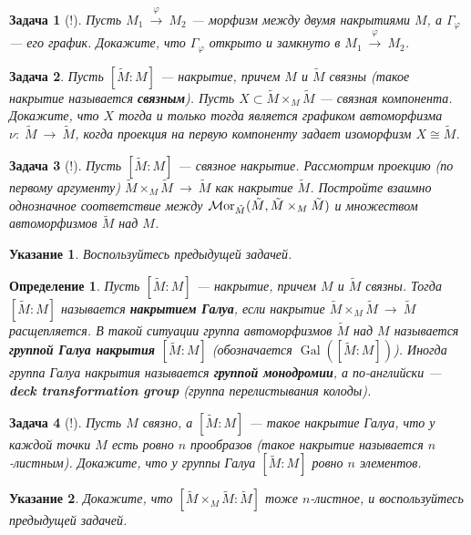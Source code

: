 \documentclass[12pt]{book}
\newcommand{\arrow}{{\:\longrightarrow\:}}
\renewcommand{\phi}{\varphi}
\newcommand{\Gal}{\operatorname{Gal}}
\newcommand{\Mor}{\operatorname{{\cal M}or}}
\theoremstyle{upshape}
\newtheorem{zadacha}{Задача}[chapter]
\theoremstyle{generic}
\newtheorem{opredelenie}[teorema]{Определение}
\theoremstyle{upshapenonumber}
\newtheorem{ukazanie}{Указание}[section]
\newcommand{\следствие}{%
     \refstepcounter{teorema}
     {\noindent\bf Следствие \thechapter.\arabic{teorema}:\ }}
\newcommand{\пример}{%
     \refstepcounter{teorema}
     {\noindent\bf Пример \thechapter.\arabic{teorema}:\ }}
\newcommand{\лемма}{%
     \refstepcounter{teorema}
     {\noindent\bf Лемма \thechapter.\arabic{teorema}:\ }}
\newcommand{\теорема}{%
     \refstepcounter{teorema}
     {\noindent\bf Теорема \thechapter.\arabic{teorema}:\ }}
\newcommand{\утверждение}{%
     \refstepcounter{teorema}
     {\noindent\bf Утверждение \thechapter.\arabic{teorema}:\ }}
\begin{document}
{\begin{zadacha}[!] 
Пусть $M_1\stackrel\phi\arrow M_2$ --- морфизм
между двумя накрытиями $M$, а $\Gamma_\phi$ --- его график.
Докажите, что $\Gamma_\phi$ открыто и замкнуто в 
$M_1\stackrel\phi\arrow M_2$.
\end{zadacha}

\begin{zadacha}
Пусть $[\tilde M:M]$ --- накрытие, причем
$M$ и $\tilde M$ связны (такое накрытие называется {\bf связным}). 
Пусть $X\subset \tilde M\times_M\tilde M$ --- 
связная компонента. Докажите,  что $X$ тогда и только тогда
является графиком автоморфизма 
$\nu:\; \tilde M \arrow \tilde M$, 
когда проекция на первую компоненту задает изоморфизм
$X\cong \tilde M$.
\end{zadacha}

\begin{zadacha}[!]\label{_Mor_v_pro_Zadacha_}
Пусть $[\tilde M:M]$ --- связное накрытие.
Рассмотрим проекцию (по первому аргументу)
$\tilde M\times_M\tilde M \arrow \tilde M$ как накрытие
$\tilde M$. Постройте взаимно однозначное соответствие
между  $\Mor_{\tilde M}(\tilde M, \tilde M\times_M\tilde M)$
и множеством автоморфизмов $\tilde M$ над $M$.
\end{zadacha}

\begin{ukazanie}
Воспользуйтесь предыдущей задачей.
\end{ukazanie}

\begin{opredelenie} 
Пусть $[\tilde M:M]$ --- накрытие, причем
$M$ и $\tilde M$ связны. Тогда
$[\tilde M:M]$ называется {\bf накрытием Галуа},
если накрытие $\tilde M\times_M\tilde M \arrow \tilde M$
расщепляется. В такой ситуации группа автоморфизмов
 $\tilde M$ над $M$ называется {\bf группой Галуа
накрытия $[\tilde M:M]$} (обозначается 
$\Gal([\tilde M:M])$). Иногда группа Галуа
накрытия называется {\bf группой монодромии},
а по-английски --- {\bf deck transformation group}
(группа перелистывания колоды).
\end{opredelenie}

\begin{zadacha}[!]
Пусть $M$ связно, а $[\tilde M:M]$ --- такое накрытие Галуа, 
что у каждой точки $M$ есть ровно $n$ прообразов
(такое накрытие называется $n$-листным). Докажите, что 
у группы Галуа $[\tilde M:M]$ ровно $n$ элементов.
\end{zadacha}

\begin{ukazanie} Докажите, что $[\tilde M\times_M\tilde M:\tilde M]$
тоже $n$-листное, и воспользуйтесь предыдущей задачей.
\end{ukazanie}

}
\end{document}
